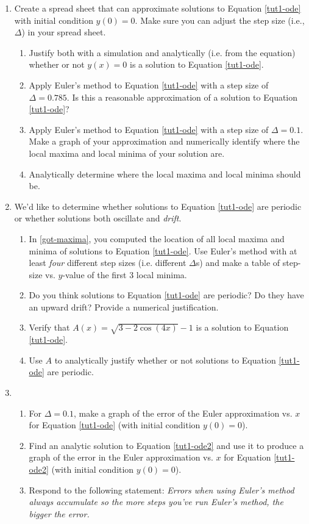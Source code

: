 		\begin{enumerate}
			\item Create a spread sheet that can approximate solutions to Equation \eqref{tut1-ode} with initial condition $y(0)=0$. Make sure you
			can adjust the step size (i.e., $\Delta$) in your spread sheet.
				\begin{enumerate}
					\item Justify both with a simulation and analytically (i.e. from the equation) whether or not $y(x)=0$
					is a solution to Equation \eqref{tut1-ode}.
					\item Apply Euler's method to Equation \eqref{tut1-ode} with a step size of $\Delta=0.785$. Is this a reasonable approximation
					of a solution to Equation \eqref{tut1-ode}?
					\item Apply Euler's method to Equation \eqref{tut1-ode} with a step size of $\Delta=0.1$. Make a graph of your approximation
					and numerically identify where the local maxima and local minima of your solution are.
					\item Analytically determine where the local maxima and
					local minima should be.
					\label{got-maxima}
				\end{enumerate}

			\item We'd like to determine whether solutions to Equation \eqref{tut1-ode} are periodic or whether solutions both oscillate and \emph{drift}.
				\begin{enumerate}
					\item In \ref{got-maxima}, you computed the location of all local maxima and minima of solutions to Equation \eqref{tut1-ode}.
					Use Euler's method with at least \emph{four} different step sizes (i.e. different $\Delta$s) and make a table of step-size vs. 
					$y$-value of the first 3 local minima.
					\item Do you think solutions to Equation \eqref{tut1-ode} are periodic? Do they have an upward drift? Provide a numerical justification.
					\item Verify that $A(x)=\sqrt{3-2\cos(4x)}-1$ is a solution to Equation \eqref{tut1-ode}.
					\item Use $A$ to analytically justify whether or not solutions to Equation \eqref{tut1-ode} are periodic.
				\end{enumerate}

			\item
				\begin{enumerate}
					\item For $\Delta=0.1$, make a graph of the error of the Euler approximation vs. $x$ for Equation \eqref{tut1-ode} (with initial condition $y(0)=0$).
					\item Find an analytic solution to Equation \eqref{tut1-ode2} and use it to produce a graph of the error in the
					Euler approximation vs. $x$ for Equation \eqref{tut1-ode2} (with initial condition $y(0)=0$).
					\item Respond to the following statement: \emph{Errors when using Euler's method always accumulate so the more steps you've run
					Euler's method, the bigger the error.}
				\end{enumerate}

		\end{enumerate}
